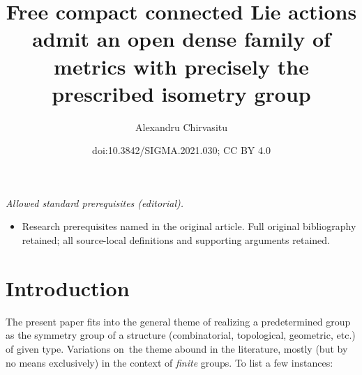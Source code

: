 \documentclass[10pt,a4paper]{amsart}
\title{Free compact connected Lie actions admit an open dense family of metrics with precisely the prescribed isometry group}
\author{Alexandru Chirvasitu}
\date{doi:10.3842/SIGMA.2021.030; CC BY 4.0}
\numberwithin{equation}{section}
\begin{document}
\maketitle
\noindent\textit{Allowed standard prerequisites (editorial).}\begin{itemize}
\item Research prerequisites named in the original article. Full original bibliography retained; all source-local definitions and supporting arguments retained.
\end{itemize}\medskip
\section{Introduction}

The present paper fits into the general theme of realizing a predetermined group as the symmetry group of a structure (combinatorial, topological, geometric, etc.) of given type. Variations on~the theme abound in the literature, mostly (but by no means exclusively) in the context of {\it finite} groups. To list a few instances:
\end{document}
